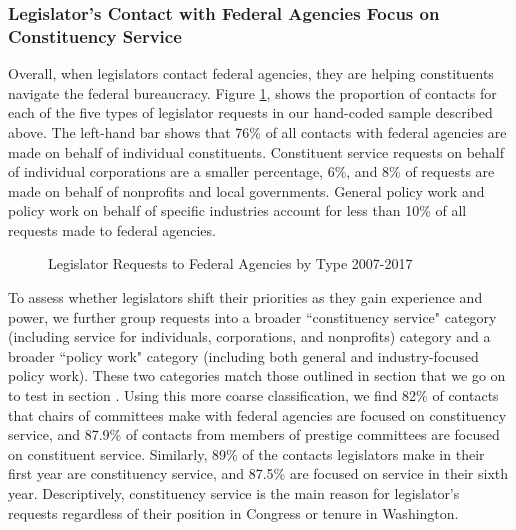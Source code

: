 \documentclass[12pt]{article}
\begin{document}
\subsubsection{Legislator's Contact with Federal Agencies Focus on Constituency Service}
Overall, when legislators contact federal agencies, they are helping constituents navigate the federal bureaucracy. Figure \ref{f:type2}, shows the proportion of contacts for each of the five types of legislator requests in our hand-coded sample described above. 
The left-hand bar shows that 76\% of all contacts with federal agencies are made on behalf of individual constituents. Constituent service requests on behalf of individual corporations are a smaller percentage, 6\%, and 8\% of requests are made on behalf of nonprofits and local governments. General policy work and policy work on behalf of specific industries account for less than 10\% of all requests made to federal agencies.  


\begin{figure}[hbt!]
\centering
\caption{Legislator Requests to Federal Agencies by Type 2007-2017} \label{f:type2}
\end{figure}



To assess whether legislators shift their priorities as they gain experience and power, we further group requests into a broader ``constituency service"  category (including service for individuals, corporations, and nonprofits) category and a broader ``policy work" category (including both general and industry-focused policy work). These two categories match those outlined in section \label{s:prestige} that we go on to test in section \label{s:prestige}. Using this more coarse classification, we find 82\% of contacts that chairs of committees make with federal agencies are focused on constituency service, and 87.9\% of contacts from members of prestige committees are focused on constituent service. Similarly, 89\% of the contacts legislators make in their first year are constituency service, and 87.5\% are focused on service in their sixth year. Descriptively, constituency service is the main reason for legislator's requests regardless of their position in Congress or tenure in Washington. 
\end{document}
